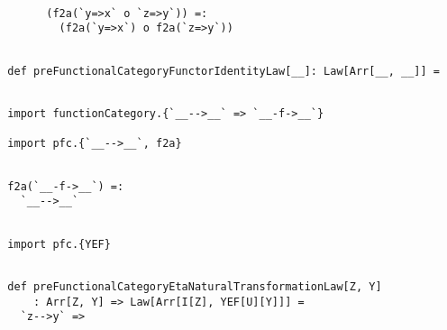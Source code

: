 \documentclass[11pt]{article}
\begin{document}
\vspace{6pt}
\begin{mdframed}[backgroundcolor=lightgray!20] 
\begin{lstlisting}

        (f2a(`y=>x` o `z=>y`)) =:
          (f2a(`y=>x`) o f2a(`z=>y`))
\end{lstlisting}
\end{mdframed}    
\vspace{6pt}
\begin{mdframed}[backgroundcolor=lightgray!20] 
\begin{lstlisting}
  
  def preFunctionalCategoryFunctorIdentityLaw[__]: Law[Arr[__, __]] =
\end{lstlisting}
\end{mdframed}
\vspace{6pt}
\begin{mdframed}[backgroundcolor=lightgray!20] 
\begin{lstlisting}

  import functionCategory.{`__-->__` => `__-f->__`}

  import pfc.{`__-->__`, f2a}
\end{lstlisting}
\end{mdframed}
\vspace{6pt}
\begin{mdframed}[backgroundcolor=lightgray!20] 
\begin{lstlisting}

  f2a(`__-f->__`) =:
    `__-->__`
\end{lstlisting}
\end{mdframed}    
\vspace{6pt}
\begin{mdframed}[backgroundcolor=lightgray!20] 
\begin{lstlisting}

  import pfc.{YEF}
\end{lstlisting}
\end{mdframed}    
\vspace{6pt}
\begin{mdframed}[backgroundcolor=lightgray!20] 
\begin{lstlisting}

  def preFunctionalCategoryEtaNaturalTransformationLaw[Z, Y]
      : Arr[Z, Y] => Law[Arr[I[Z], YEF[U][Y]]] =
    `z-->y` =>
\end{lstlisting}
\end{mdframed}
\vspace{6pt}
\end{document}
